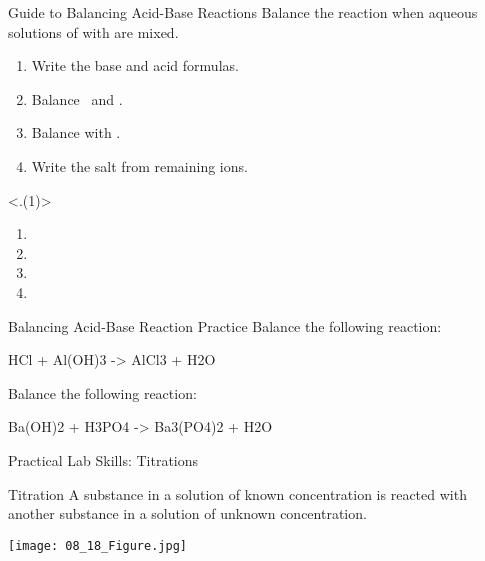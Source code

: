 \documentclass[notes=hide]{beamer}
\begin{document}

\begin{frame}[t]{Guide to Balancing Acid-Base Reactions}
	Balance the reaction when aqueous solutions of  with
	 are mixed.

	\bigskip

	\begin{enumerate}[<+(1)->]
		\item Write the base and acid formulas.
		\item Balance \Hyd\ and .
		\item Balance with \water.
		\item Write the salt from remaining ions.
	\end{enumerate}

	\note<.(1)>{%
		\begin{enumerate}
			\item {}
			\item {}
			\item {}
			\item {}
		\end{enumerate}
		}
\end{frame}

\clearpage

\begin{frame}[t]{Balancing Acid-Base Reaction Practice}
	Balance the following reaction:
	\begin{reaction*}
		HCl\aq{} + Al(OH)3\aq{} -> AlCl3\aq{} + H2O\lqd
	\end{reaction*}
\end{frame}

\begin{onyourown}
	Balance the following reaction:

	\begin{reaction*}
		Ba(OH)2\aq{} + H3PO4\aq{} -> Ba3(PO4)2\sld{} + H2O\lqd{}
	\end{reaction*}
\end{onyourown}

\begin{frame}{Practical Lab Skills: Titrations}
	\begin{block}{Titration}
		A substance in a solution of known concentration is reacted with
		another substance in a solution of unknown concentration.
	\end{block}

	\begin{center}
		\texttt{[image: 08\_18\_Figure.jpg]}
	\end{center}
\end{frame}
\end{document}
